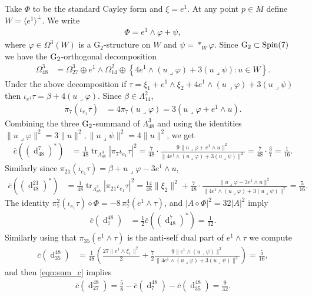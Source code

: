 \documentclass[10pt,a4paper,reqno]{article}
\theoremstyle{definition}
\numberwithin{equation}{section}
\DeclareMathOperator{\dd}{d}
\def\G2{\mathrm{G}_2}
\begin{document}
Take $\Phi$ to be the standard Cayley form and $\xi=e^1$. At any point $p\in M$ define $W=\langle e^1\rangle^\perp$. We write 
\begin{align*}
    \Phi=e^1\wedge\varphi + \psi,
\end{align*} where $\varphi \in \Omega^3(W)$ is a $\G2$-structure on $W$ and $\psi=*_W\varphi$. Since $\rm{G}_2\subset \operatorname{Spin(7)}$ we have the $\rm{G}_2$-orthogonal decomposition 
\begin{align*}
    \Omega^3_{48}&= \Omega^3_{27}\oplus e^1\wedge\Omega^2_{14}\oplus\left\{4e^1\wedge (u\lrcorner \varphi)+3(u\lrcorner \psi):u\in W\right\}.
\end{align*} Under the above decomposition if  $\tau = \xi_1+e^1\wedge\xi_2 +4e^1\wedge (u\lrcorner \varphi)+3(u\lrcorner \psi) $ then $\iota_{e^1}\tau = \beta+4 (u\lrcorner \varphi)$. Since $\beta\in\Lambda^2_{14}$, 
\begin{align*}
    \pi_7(\iota_{e_1}\tau) &= 4\pi_7(u\lrcorner \varphi) = 3(u\lrcorner\varphi+e^1\wedge u). 
\end{align*} Combining the three ${\rm{G}}_2$-summand of $\Lambda^3_{48}$ and using the identities $\|u\lrcorner\varphi\|^2=3\|u\|^2, \|u\lrcorner\psi\|^2=4\|u\|^2$, we get
\begin{align*}
   \overline{c}((\dd^{7}_{48})^*)&= \frac{1}{48}\operatorname{tr}_{\Lambda^3_{48}}
|\pi_7\iota_{e_1}\tau|^2=\frac{7}{48}\cdot\frac{9\|u\lrcorner\varphi+e^1\wedge u\|^2}{\|4e^1\wedge (u\lrcorner \varphi)+3(u\lrcorner \psi)\|^2} = \frac{7}{48}\cdot \frac{3}{7} =\frac{1}{16}.
\end{align*}
Similarly since $ \pi_{21}(\iota_{e_1}\tau) =  \beta + u\lrcorner \varphi -3 e^1\wedge u$, 
\begin{align*}
   \overline{c}((\dd^{21}_{48})^*)&= \frac{1}{48}\operatorname{tr}_{\Lambda^3_{48}}
|\pi_{21}\iota_{e_1}\tau|^2=\frac{14}{48} \|\xi_2\|^2+\frac{7}{48}\cdot\frac{\|u\lrcorner\varphi-3e^1\wedge u\|^2}{\|4e^1\wedge (u\lrcorner \varphi)+3(u\lrcorner \psi)\|^2}  =\frac{5}{16}.
\end{align*}
The identity $\pi^2_7(\iota_{e_1}\tau)\diamond \Phi=-8\,\pi^4_7(e^1\wedge\tau)$, and $|A\diamond\Phi|^2=32|A|^2$ imply
\begin{align*}
    \overline{c}(\dd^{48}_{7})&=\frac{1}{2} \overline{c}((\dd^{7}_{48})^*) =\frac{1}{32}. 
\end{align*}
Similarly using that $\pi_{35}(e^1\wedge\tau)$ is the anti-self dual part of $e^1\wedge\tau$ we compute 
\begin{align*}
    \overline{c}(\dd^{48}_{35})&=\frac{1}{48}\left(\frac{27\|e^1\wedge\xi_1\|^2}{2}+\frac{7}{2} \frac{9\|e^1\wedge(u\lrcorner\psi)\|^2}{\|4e^1\wedge (u\lrcorner \varphi)+3(u\lrcorner \psi)\|^2}\right)= \frac{5}{16},
\end{align*}
and then \cref{eqn:sum_c} implies
\begin{align*}
    \overline{c}(\dd^{48}_{27})=\frac{5}{8}-\overline{c}(\dd^{48}_{7})-\overline{c}(\dd^{48}_{35}) = \frac{9}{32}.
\end{align*} 
\end{document}
